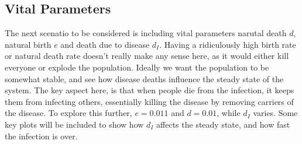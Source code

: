 \subsection{Vital Parameters}
The next scenatio to be considered is including vital parameters narutal death $d$, natural birth $e$ and death due to disease $d_I$.
Having a ridiculously high birth rate or natural death rate doesn't really make any sense here, as it would either kill everyone or explode the population.
Ideally we want the population to be somewhat stable, and see how disease deaths influence the steady state of the system.
The key aspect here, is that when people die from the infection, it keeps them from infecting others, essentially killing the disease by removing carriers of the disease.
To explore this further, $e=0.011$ and $d=0.01$, while $d_I$ varies. 
Some key plots will be included to show how $d_I$ affects the steady state, and how fast the infection is over.


